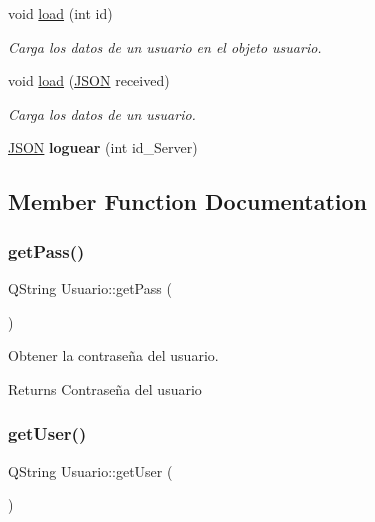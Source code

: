 \begin{DoxyCompactItemize}
void \mbox{\hyperlink{classUsuario_a582cfc5fb035575f66240d1784c50632}{load}} (int id)
\begin{DoxyCompactList}\small\item\em Carga los datos de un usuario en el objeto usuario. \end{DoxyCompactList}\item 
void \mbox{\hyperlink{classUsuario_ae1167727130e5f8fb07fad0d7c179c41}{load}} (\mbox{\hyperlink{jugador_8h_ab6104b89642419db4e355b7b2e40abbe}{J\+S\+ON}} received)
\begin{DoxyCompactList}\small\item\em Carga los datos de un usuario. \end{DoxyCompactList}\item 
\mbox{\label{classUsuario_a1c5dda54d22375d8daa0d121df105b7d}} 
\mbox{\hyperlink{jugador_8h_ab6104b89642419db4e355b7b2e40abbe}{J\+S\+ON}} {\bfseries loguear} (int id\+\_\+\+Server)
\end{DoxyCompactItemize}


\subsection{Member Function Documentation}
\mbox{\label{classUsuario_ae00ae9ee09459165c7b7ecb060ff7071}} 
\subsubsection{\texorpdfstring{get\+Pass()}{getPass()}}
{\footnotesize\ttfamily Q\+String Usuario\+::get\+Pass (\begin{DoxyParamCaption}{ }\end{DoxyParamCaption})}



Obtener la contraseña del usuario. 

\begin{DoxyReturn}{Returns}
Contraseña del usuario 
\end{DoxyReturn}
\mbox{\label{classUsuario_a26932183472124e9054d95c534e6f7e9}} 
\subsubsection{\texorpdfstring{get\+User()}{getUser()}}
{\footnotesize\ttfamily Q\+String Usuario\+::get\+User (\begin{DoxyParamCaption}{ }\end{DoxyParamCaption})}



